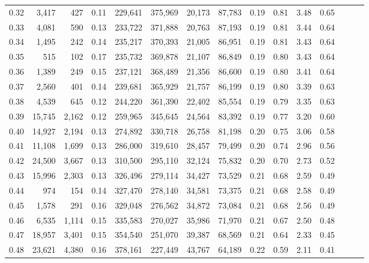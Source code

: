 \begin{tabular}{rrrrrrrrrrrrrrr}
0.32 &   3,417 &    427 &  0.11 &  229,641 &  375,969 &   20,173 &   87,783 &  0.19 &  0.81 &  3.48 &      0.65 \\
0.33 &   4,081 &    590 &  0.13 &  233,722 &  371,888 &   20,763 &   87,193 &  0.19 &  0.81 &  3.44 &      0.64 \\
0.34 &   1,495 &    242 &  0.14 &  235,217 &  370,393 &   21,005 &   86,951 &  0.19 &  0.81 &  3.43 &      0.64 \\
0.35 &     515 &    102 &  0.17 &  235,732 &  369,878 &   21,107 &   86,849 &  0.19 &  0.80 &  3.43 &      0.64 \\
0.36 &   1,389 &    249 &  0.15 &  237,121 &  368,489 &   21,356 &   86,600 &  0.19 &  0.80 &  3.41 &      0.64 \\
0.37 &   2,560 &    401 &  0.14 &  239,681 &  365,929 &   21,757 &   86,199 &  0.19 &  0.80 &  3.39 &      0.63 \\
0.38 &   4,539 &    645 &  0.12 &  244,220 &  361,390 &   22,402 &   85,554 &  0.19 &  0.79 &  3.35 &      0.63 \\
0.39 &  15,745 &  2,162 &  0.12 &  259,965 &  345,645 &   24,564 &   83,392 &  0.19 &  0.77 &  3.20 &      0.60 \\
0.40 &  14,927 &  2,194 &  0.13 &  274,892 &  330,718 &   26,758 &   81,198 &  0.20 &  0.75 &  3.06 &      0.58 \\
0.41 &  11,108 &  1,699 &  0.13 &  286,000 &  319,610 &   28,457 &   79,499 &  0.20 &  0.74 &  2.96 &      0.56 \\
0.42 &  24,500 &  3,667 &  0.13 &  310,500 &  295,110 &   32,124 &   75,832 &  0.20 &  0.70 &  2.73 &      0.52 \\
0.43 &  15,996 &  2,303 &  0.13 &  326,496 &  279,114 &   34,427 &   73,529 &  0.21 &  0.68 &  2.59 &      0.49 \\
0.44 &     974 &    154 &  0.14 &  327,470 &  278,140 &   34,581 &   73,375 &  0.21 &  0.68 &  2.58 &      0.49 \\
0.45 &   1,578 &    291 &  0.16 &  329,048 &  276,562 &   34,872 &   73,084 &  0.21 &  0.68 &  2.56 &      0.49 \\
0.46 &   6,535 &  1,114 &  0.15 &  335,583 &  270,027 &   35,986 &   71,970 &  0.21 &  0.67 &  2.50 &      0.48 \\
0.47 &  18,957 &  3,401 &  0.15 &  354,540 &  251,070 &   39,387 &   68,569 &  0.21 &  0.64 &  2.33 &      0.45 \\
0.48 &  23,621 &  4,380 &  0.16 &  378,161 &  227,449 &   43,767 &   64,189 &  0.22 &  0.59 &  2.11 &      0.41 \\

\end{tabular}

